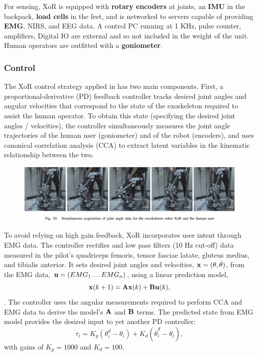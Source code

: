 \begin{refsection}
For sensing, XoR is equipped with \textbf{rotary encoders} at joints, an \textbf{IMU} in the backpack, \textbf{load cells} in the feet, and is networked to servers capable of providing \textbf{EMG}, NIRS, and EEG data.  A control PC running at 1 KHz, pulse counter, amplifiers, Digital IO are external and so not included in the weight of the unit.  Human operators are outfitted with a \textbf{goniometer}.


\subsubsection{Control}

The XoR control strategy applied in \cite{XoRkinemExtraction2012} has two main components.  First, a proportional-derivative (PD) feedback controller tracks desired joint angles and angular velocities that correspond to the state of the exoskeleton required to assist the human operator.  To obtain this state (specifying the desired joint angles / velocities), the controller simultaneously measures the joint angle trajectories of the human user (goniometer) and of the robot (encoders), and uses canonical correlation analysis (CCA) to extract latent variables in the kinematic relationship between the two.

\begin{figure}[ht]
  \centering
  \includegraphics[width=6.0in]{exos/figs/xor_joint_angles.png}
\end{figure}

To avoid relying on high gain feedback, XoR incorporates user intent through EMG data.  The controller rectifies and low pass filters (10 Hz cut-off) data measured in the pilot's quadriceps femoris, tensor fasciae latate, gluteus medius, and tibialis anterior. 
It sets desired joint angles and velocities, ${\bf x} = ({\bf \theta}, \dot{\bf \theta})$, from the EMG data, ${\bf u} = (EMG_1 \dots EMG_n)$, using a linear prediction model, 
\[{\bf x}(k+1) = {\bf A}{\bf x}(k)+{\bf B}{\bf u}(k),\].  
The controller uses the angular measurements required to perform CCA and EMG data to derive the model's ${\bf A}$ and ${\bf B}$ terms.  The predicted state from EMG model provides the desired input to yet another PD controller: 
\[\tau_i = K_p (\theta_i^d - \theta_i) + K_d (\dot\theta_i^d - \dot \theta_i),\] 
with gains of $K_p = 1000$ and $K_d = 100$.


\end{refsection}
